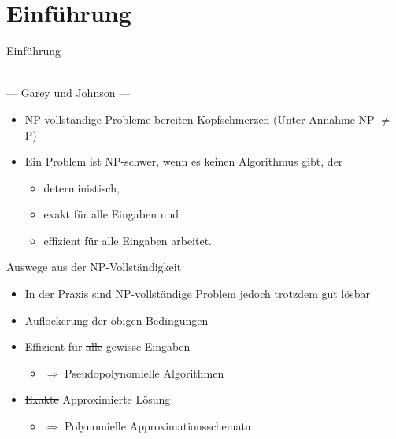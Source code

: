 \section{Einführung}

\begin{frame}{Einführung}
	\begin{minipage}[t][0.25\textheight]{1\textwidth}
		\centering
		{\textit{} \\ --- Garey und Johnson ---}
	\end{minipage}
	\pause
	\begin{minipage}[t][0.5\textheight]{1\textwidth}
	\begin{itemize}
		\item NP-vollständige Probleme bereiten Kopfschmerzen (Unter Annahme NP $\neq$ P)
		\item Ein Problem ist NP-schwer, wenn es keinen Algorithmus gibt, der
			\begin{itemize}
				\item	deterministisch,
				\item exakt für alle Eingaben und 
				\item	effizient für alle Eingaben arbeitet.
			\end{itemize}
		\end{itemize}
	\end{minipage}
\end{frame}

\begin{frame}{Auswege aus der NP-Vollständigkeit}
\begin{itemize}
	\item In der Praxis sind NP-vollständige Problem jedoch trotzdem gut lösbar
	\item Auflockerung der obigen Bedingungen
	\item Effizient für \st{alle} gewisse Eingaben 
	\begin{itemize}
		\item[] $\Rightarrow$ Pseudopolynomielle Algorithmen
	\end{itemize}
	\item \st{Exakte} Approximierte Lösung
	\begin{itemize}
		\item[] $\Rightarrow$ Polynomielle Approximationsschemata
	\end{itemize}
\end{itemize}
\end{frame}

